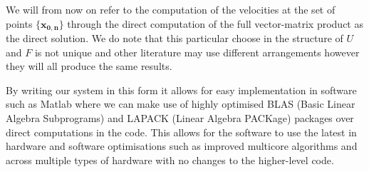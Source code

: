 We will from now on refer to the computation of the velocities at the set of points $\{ \mathbf{x_{0,n}} \}$ through the direct computation of the full vector-matrix product as the direct solution.
We do note that this particular choose in the structure of $U$ and $F$ is not unique and other literature may use different arrangements however they will all produce the same results. 

By writing our system in this form it allows for easy implementation in software such as Matlab where we can make use of highly optimised BLAS (Basic Linear Algebra Subprograms) and LAPACK (Linear Algebra PACKage) packages over direct computations in the code. This allows for the software to use the latest in hardware and software optimisations such as improved multicore algorithms and across multiple types of hardware with no changes to the higher-level code.